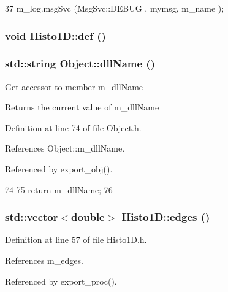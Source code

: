 \begin{DoxyCode}
37 { m_log.msgSvc (MsgSvc::DEBUG   , mymsg, m_name ); }
\end{DoxyCode}
\hypertarget{classHisto1D_a22b820e2c706d8e8614c31962f1ac6d0}{
\subsubsection[{def}]{\setlength{\rightskip}{0pt plus 5cm}void Histo1D::def ()}}
\label{classHisto1D_a22b820e2c706d8e8614c31962f1ac6d0}
\hypertarget{classObject_a2e3947f2870094c332d7454117f3ec63}{
\subsubsection[{dllName}]{\setlength{\rightskip}{0pt plus 5cm}std::string Object::dllName ()}}
\label{classObject_a2e3947f2870094c332d7454117f3ec63}
Get accessor to member m\_\-dllName \begin{DoxyReturn}{Returns}
the current value of m\_\-dllName 
\end{DoxyReturn}


Definition at line 74 of file Object.h.

References Object::m\_\-dllName.

Referenced by export\_\-obj().


\begin{DoxyCode}
74                        {
75     return m_dllName;
76   }  
\end{DoxyCode}
\hypertarget{classHisto1D_a8c74413d35bce2e244defd470b6b4ebf}{
\subsubsection[{edges}]{\setlength{\rightskip}{0pt plus 5cm}std::vector$<$double$>$ Histo1D::edges ()}}
\label{classHisto1D_a8c74413d35bce2e244defd470b6b4ebf}


Definition at line 57 of file Histo1D.h.

References m\_\-edges.

Referenced by export\_\-proc().


